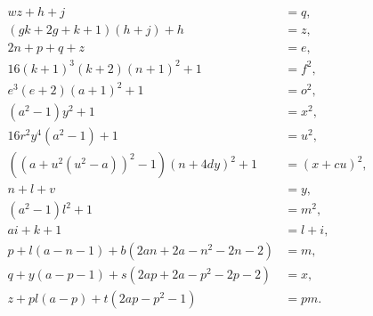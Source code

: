 \begin{align}
  w z + h + j &= q \tag{S1},\\
  (g k + 2g + k + 1) (h + j) + h &= z \tag{S2},\\
  2n + p + q + z &= e \tag{S3},\\
  16 (k + 1)^{3} (k + 2) (n + 1)^{2} + 1 &= f^{2} \tag{S4},\\
  e^{3} (e + 2) (a + 1)^{2} + 1 &= o^{2} \tag{S5},\\
  (a^{2} - 1) y^{2} + 1 &= x^{2} \tag{S6},\\
  16r^{2} y^{4} (a^{2} - 1) + 1 &= u^{2} \tag{S7},\\
  ((a + u^{2} (u^{2} - a))^{2} - 1) (n + 4d y)^{2} + 1 &= (x + c u)^{2} \tag{S8},\\
  n + l + v &= y \tag{S9},\\
  (a^{2} - 1) l^{2} + 1 &= m^{2} \tag{S10},\\
  a i + k + 1 &= l + i \tag{S11},\\
  p + l (a - n - 1) + b (2a n + 2a - n^{2} - 2n - 2) &= m \tag{S12},\\
  q + y (a - p - 1) + s (2a p + 2a - p^{2} - 2p - 2) &= x \tag{S13},\\
  z + p l (a - p) + t (2a p - p^{2} - 1) &= p m \tag{S14}.
\end{align}
